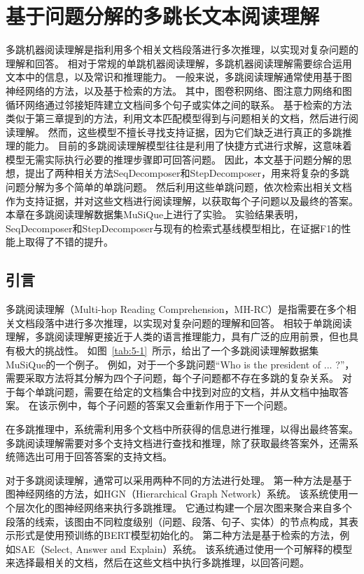 \chapter{基于问题分解的多跳长文本阅读理解}
多跳机器阅读理解是指利用多个相关文档段落进行多次推理，以实现对复杂问题的理解和回答。
相对于常规的单跳机器阅读理解，多跳机器阅读理解需要综合运用文本中的信息，以及常识和推理能力。
一般来说，多跳阅读理解通常使用基于图神经网络的方法，以及基于检索的方法。
其中，图卷积网络、图注意力网络和图循环网络通过邻接矩阵建立文档间多个句子或实体之间的联系。
基于检索的方法类似于第三章提到的方法，利用文本匹配模型得到与问题相关的文档，然后进行阅读理解。
然而，这些模型不擅长寻找支持证据，因为它们缺乏进行真正的多跳推理的能力。
目前的多跳阅读理解模型往往是利用了快捷方式进行求解，这意味着模型无需实际执行必要的推理步骤即可回答问题。
因此，本文基于问题分解的思想，提出了两种相关方法SeqDecomposer和StepDecomposer，用来将复杂的多跳问题分解为多个简单的单跳问题。
然后利用这些单跳问题，依次检索出相关文档作为支持证据，并对这些文档进行阅读理解，以获取每个子问题以及最终的答案。
本章在多跳阅读理解数据集MuSiQue上进行了实验。
实验结果表明，SeqDecomposer和StepDecomposer与现有的检索式基线模型相比，在证据F1的性能上取得了不错的提升。

\section{引言}
多跳阅读理解\cite{Yang2018HotpotQAAD}（Multi-hop Reading Comprehension，MH-RC）是指需要在多个相关文档段落中进行多次推理，以实现对复杂问题的理解和回答。
相较于单跳阅读理解，多跳阅读理解更接近于人类的语言推理能力，具有广泛的应用前景，但也具有极大的挑战性。
如图~\ref{tab:5-1}~所示，给出了一个多跳阅读理解数据集MuSiQue的一个例子。
例如，对于一个多跳问题“Who is the president of ... ?”，需要采取方法将其分解为四个子问题，每个子问题都不存在多跳的复杂关系。
对于每个单跳问题，需要在给定的文档集合中找到对应的文档，并从文档中抽取答案。
在该示例中，每个子问题的答案又会重新作用于下一个问题。



在多跳推理中，系统需利用多个文档中所获得的信息进行推理，以得出最终答案。
多跳阅读理解需要对多个支持文档进行查找和推理，除了获取最终答案外，还需系统筛选出可用于回答答案的支持文档。

对于多跳阅读理解，通常可以采用两种不同的方法进行处理。
第一种方法是基于图神经网络的方法，如HGN\cite{Fang2019HierarchicalGN}（Hierarchical Graph Network）系统。
该系统使用一个层次化的图神经网络来执行多跳推理。
它通过构建一个层次图来聚合来自多个段落的线索，该图由不同粒度级别（问题、段落、句子、实体）的节点构成，其表示形式是使用预训练的BERT模型初始化的。
第二种方法是基于检索的方法，例如SAE\cite{Tu2019SelectAA}（Select, Answer and Explain）系统。
该系统通过使用一个可解释的模型来选择最相关的文档，然后在这些文档中执行多跳推理，以回答问题。

